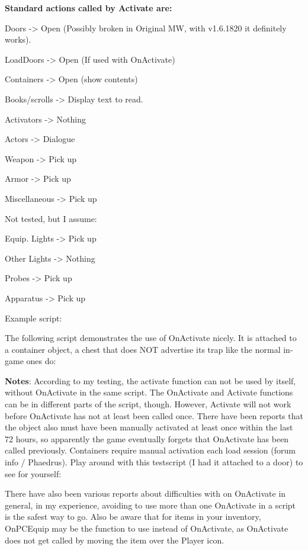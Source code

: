 \textbf{Standard actions called by Activate are:}

Doors -\textgreater{} Open (Possibly broken in Original MW, with
v1.6.1820 it definitely works).

LoadDoors -\textgreater{} Open (If used with OnActivate)

Containers -\textgreater{} Open (show contents)

Books/scrolls -\textgreater{} Display text to read.

Activators -\textgreater{} Nothing

Actors -\textgreater{} Dialogue

Weapon -\textgreater{} Pick up

Armor -\textgreater{} Pick up

Miscellaneous -\textgreater{} Pick up

Not tested, but I assume:

Equip. Lights -\textgreater{} Pick up

Other Lights -\textgreater{} Nothing

Probes -\textgreater{} Pick up

Apparatus -\textgreater{} Pick up

Example script:

The following script demonstrates the use of OnActivate nicely. It is
attached to a container object, a chest that does NOT advertise its trap
like the normal in-game ones do:



\textbf{Notes}: According to my testing, the activate function can not be used by itself, without OnActivate in the same script. The OnActivate and Activate functions can be in different parts of the script, though. However, Activate will not work before OnActivate has not at least been called once. There have been reports that the object also must have been manually activated at least once within the last 72 hours, so apparently the game eventually forgets that OnActivate has been called previously. Containers require manual activation each load session (forum info / Phaedrus). Play around with this testscript (I had it attached to a door) to
see for yourself:



There have also been various reports about difficulties with on
OnActivate in general, in my experience, avoiding to use more than one
OnActivate in a script is the safest way to go. Also be aware that for
items in your inventory, OnPCEquip may be the function to use instead of
OnActivate, as OnActivate does not get called by moving the item over
the Player icon.

